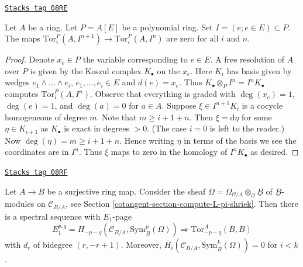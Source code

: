 \begin{lemma}
\label{cotangent-lemma-map-tors-zero}
\href{https://stacks.math.columbia.edu/tag/08RE}{\texttt{Stacks tag 08RE}}

Let $A$ be a ring. Let $P = A[E]$ be a polynomial ring.
Set $I = (e; e \in E) \subset P$. The maps
$\text{Tor}_i^P(A, I^{n + 1}) \to \text{Tor}_i^P(A, I^n)$
are zero for all $i$ and $n$.
\end{lemma}

\begin{proof}
Denote $x_e \in P$ the variable corresponding to $e \in E$.
A free resolution of $A$ over $P$ is given by the Koszul complex
$K_\bullet$ on the $x_e$. Here $K_i$ has basis given by wedges
$e_1 \wedge \ldots \wedge e_i$, $e_1, \ldots, e_i \in E$ and $d(e) = x_e$.
Thus $K_\bullet \otimes_P I^n = I^nK_\bullet$ computes
$\text{Tor}_i^P(A, I^n)$. Observe that everything is graded
with $\deg(x_e) = 1$, $\deg(e) = 1$, and $\deg(a) = 0$ for $a \in A$.
Suppose $\xi \in I^{n + 1}K_i$ is a cocycle homogeneous of degree $m$.
Note that $m \geq i + 1 + n$. Then $\xi = \text{d}\eta$ for some
$\eta \in K_{i + 1}$ as $K_\bullet$ is exact in degrees $ > 0$.
(The case $i = 0$ is left to the reader.)
Now $\deg(\eta) = m \geq i + 1 + n$. Hence writing $\eta$
in terms of the basis we see the coordinates are in $I^n$.
Thus $\xi$ maps to zero in the homology of $I^nK_\bullet$ as desired.
\end{proof}

\begin{theorem}

\label{cotangent-theorem-quillen-spectral-sequence}
\href{https://stacks.math.columbia.edu/tag/08RF}{\texttt{Stacks tag 08RF}}

Let $A \to B$ be a surjective ring map. Consider the sheaf
$\Omega = \Omega_{\mathcal{O}/A} \otimes_\mathcal{O} \underline{B}$ of
$\underline{B}$-modules on $\mathcal{C}_{B/A}$, see
Section \ref{cotangent-section-compute-L-pi-shriek}.
Then there is a spectral sequence with $E_1$-page
$$
E_1^{p, q} =
H_{- p - q}(\mathcal{C}_{B/A}, \text{Sym}^p_{\underline{B}}(\Omega))
\Rightarrow \text{Tor}^A_{- p - q}(B, B)
$$
with $d_r$ of bidegree $(r, -r + 1)$.
Moreover, $H_i(\mathcal{C}_{B/A}, \text{Sym}^k_{\underline{B}}(\Omega)) = 0$
for $i < k$.
\end{theorem}

